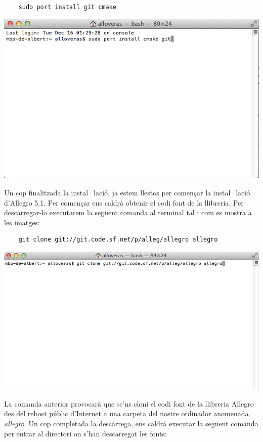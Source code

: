 \documentclass[11pt]{article}
\begin{document}
\begin{verbatim}
	sudo port install git cmake
\end{verbatim}

\begin{center}
	\includegraphics[scale=0.5]{img/Ports_Install_Git_Cmake.png}
\end{center}

\noindent Un cop finalitzada la instal·lació, ja estem llestos per començar la instal·lació d'Allegro 5.1. Per començar ens caldrà obtenir el codi font de la llibreria. Per descarregar-lo executarem la següent comanda al terminal tal i com es mostra a les imatges:

\begin{verbatim}
	git clone git://git.code.sf.net/p/alleg/allegro allegro
\end{verbatim}

\begin{center}
	\includegraphics[scale=0.5]{img/Git_Clone.png}
\end{center}

\noindent La comanda anterior provocarà que se'ns cloni el codi font de la llibreria Allegro des del rebost públic d'Internet a una carpeta del nostre ordinador anomenada \textit{allegro}. Un cop completada la descàrrega, ens caldrà executar la següent comanda per entrar al directori on s'han descarregat les fonts:
\end{document}
